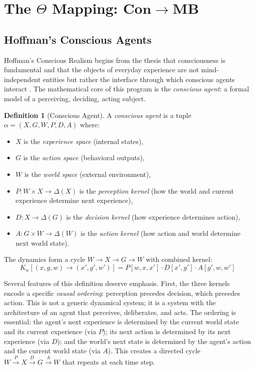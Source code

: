 \documentclass[11pt,a4paper]{article}
\theoremstyle{definition}
\newtheorem{definition}{Definition}[section]
\theoremstyle{plain}
\theoremstyle{remark}
\newcommand{\Con}{\mathbf{Con}}
\newcommand{\MB}{\mathbf{MB}}
\begin{document}
\section{The $\Theta$ Mapping: $\Con \to \MB$}\label{sec:theta}

\subsection{Hoffman's Conscious Agents}\label{sec:hoffman}

Hoffman's Conscious Realism begins from the thesis that consciousness is fundamental and that the objects of everyday experience are not mind-independent entities but rather the interface through which conscious agents interact \citep{Hoffman2014,Hoffman2019}. The mathematical core of this program is the \textit{conscious agent}: a formal model of a perceiving, deciding, acting subject.

\begin{definition}[Conscious Agent]
A \emph{conscious agent} is a tuple $\alpha = (X, G, W, P, D, A)$ where:
\begin{itemize}
    \item $X$ is the \emph{experience space} (internal states),
    \item $G$ is the \emph{action space} (behavioral outputs),
    \item $W$ is the \emph{world space} (external environment),
    \item $P: W \times X \to \Delta(X)$ is the \emph{perception kernel} (how the world and current experience determine next experience),
    \item $D: X \to \Delta(G)$ is the \emph{decision kernel} (how experience determines action),
    \item $A: G \times W \to \Delta(W)$ is the \emph{action kernel} (how action and world determine next world state).
\end{itemize}
The dynamics form a cycle $W \to X \to G \to W$ with combined kernel:
$$K_\alpha[(x, g, w) \to (x', g', w')] = P[w, x, x'] \cdot D[x', g'] \cdot A[g', w, w']$$
\end{definition}

Several features of this definition deserve emphasis. First, the three kernels encode a specific \textit{causal ordering}: perception precedes decision, which precedes action. This is not a generic dynamical system; it is a system with the architecture of an agent that perceives, deliberates, and acts. The ordering is essential: the agent's next experience is determined by the current world state and its current experience (via $P$); its next action is determined by its next experience (via $D$); and the world's next state is determined by the agent's action and the current world state (via $A$). This creates a directed cycle $W \xrightarrow{P} X \xrightarrow{D} G \xrightarrow{A} W$ that repeats at each time step.
\end{document}
